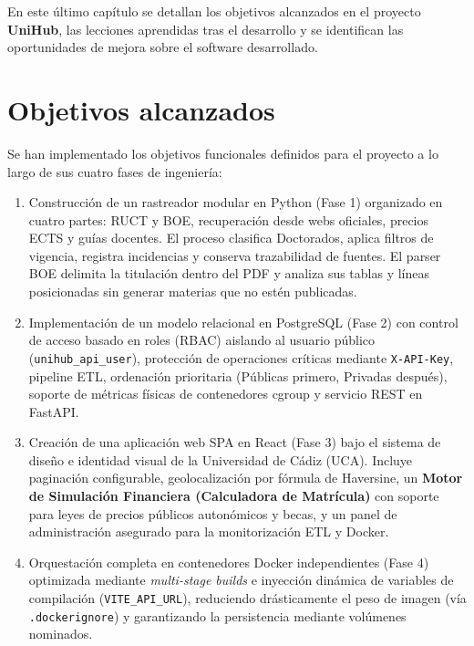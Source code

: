 En este último capítulo se detallan los objetivos alcanzados en el proyecto \textbf{UniHub}, las lecciones aprendidas tras el desarrollo y se identifican las oportunidades de mejora sobre el software desarrollado.

\section{Objetivos alcanzados}
Se han implementado los objetivos funcionales definidos para el proyecto a lo largo de sus cuatro fases de ingeniería:
\begin{enumerate}
    \item Construcción de un rastreador modular en Python (Fase 1) organizado en cuatro partes: RUCT y BOE, recuperación desde webs oficiales, precios ECTS y guías docentes. El proceso clasifica Doctorados, aplica filtros de vigencia, registra incidencias y conserva trazabilidad de fuentes. El parser BOE delimita la titulación dentro del PDF y analiza sus tablas y líneas posicionadas sin generar materias que no estén publicadas.
    \item Implementación de un modelo relacional en PostgreSQL (Fase 2) con control de acceso basado en roles (RBAC) aislando al usuario público (\texttt{unihub\_api\_user}), protección de operaciones críticas mediante \texttt{X-API-Key}, pipeline ETL, ordenación prioritaria (Públicas primero, Privadas después), soporte de métricas físicas de contenedores cgroup y servicio REST en FastAPI.
    \item Creación de una aplicación web SPA en React (Fase 3) bajo el sistema de diseño e identidad visual de la Universidad de Cádiz (UCA). Incluye paginación configurable, geolocalización por fórmula de Haversine, un \textbf{Motor de Simulación Financiera (Calculadora de Matrícula)} con soporte para leyes de precios públicos autonómicos y becas, y un panel de administración asegurado para la monitorización ETL y Docker.
    \item Orquestación completa en contenedores Docker independientes (Fase 4) optimizada mediante \emph{multi-stage builds} e inyección dinámica de variables de compilación (\texttt{VITE\_API\_URL}), reduciendo drásticamente el peso de imagen (vía \texttt{.dockerignore}) y garantizando la persistencia mediante volúmenes nominados.
\end{enumerate}

